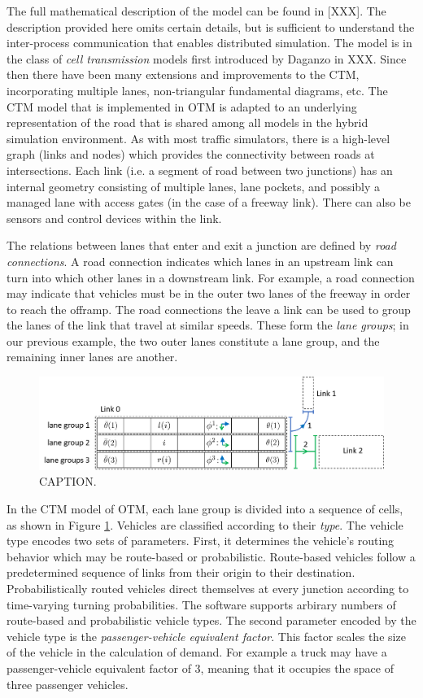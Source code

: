 The full mathematical description of the model can be found in [XXX]. The description provided here omits certain details, but is sufficient to understand the inter-process communication that enables distributed simulation. The model is in the class of \textit{cell transmission} models first introduced by Daganzo in XXX. Since then there have been many extensions and improvements to the CTM, incorporating multiple lanes, non-triangular fundamental diagrams, etc. The CTM model that is implemented in OTM is adapted to an underlying representation of the road that is shared among 
all models in the hybrid simulation environment. As with most traffic simulators, there is a high-level graph (links and nodes) which provides the connectivity between roads at intersections. Each link (i.e. a segment of road between two junctions) has an internal geometry consisting of multiple lanes, lane pockets, and possibly a managed lane with access gates (in the case of a freeway link). There can also be sensors and control devices within the link. 

The relations between lanes that enter and exit a junction are defined by \textit{road connections}. A road connection indicates which lanes in an upstream link can turn into which other lanes in a downstream link. For example, a road connection may indicate that vehicles must be in the outer two lanes of the freeway in order to reach the offramp. The road connections the leave a link can be used to group the lanes of the link that travel at similar speeds. These form the \textit{lane groups}; in our previous example, the two outer lanes constitute a lane group, and the remaining inner lanes are another. 

\begin{figure}[h!]
    \centering
    \includegraphics[width=\columnwidth]{figs/cells.png}
    \caption{CAPTION.}
    \label{fig:cells}
\end{figure}

In the CTM model of OTM, each lane group is divided into a sequence of cells, as shown in Figure \ref{fig:cells}. Vehicles are classified according to their \textit{type}. The vehicle type encodes two sets of parameters. First, it determines the vehicle's routing behavior which may be route-based or probabilistic. Route-based vehicles follow a predetermined sequence of links from their origin to their destination. Probabilistically routed vehicles direct themselves at every junction according to time-varying turning probabilities. The software supports arbirary numbers of route-based and probabilistic vehicle types. The second parameter encoded by the vehicle type is the \textit{passenger-vehicle equivalent factor}. This factor scales the size of the vehicle in the calculation of demand. For example a truck may have a passenger-vehicle equivalent factor of 3, meaning that it occupies the space of three passenger vehicles.

